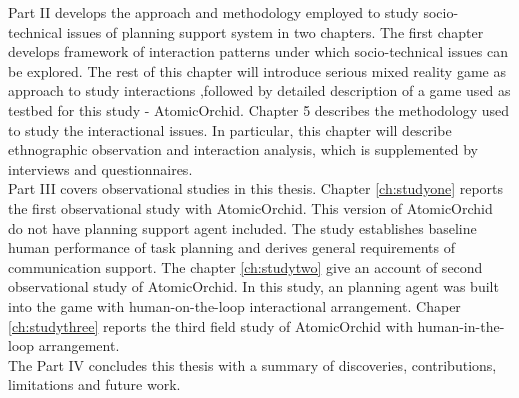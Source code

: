 Part II develops the approach and methodology employed to study socio-technical issues of planning support system in two chapters. The first chapter develops framework of interaction patterns under which socio-technical issues can be explored. The rest of this chapter will introduce serious mixed reality game as approach to study interactions  ,followed by detailed description of a game used as testbed for this study - AtomicOrchid. Chapter 5 describes the methodology used to study the interactional issues. In particular, this chapter will describe ethnographic observation and interaction analysis, which is supplemented by interviews and questionnaires. \\ 

Part III covers observational studies in this thesis. Chapter \ref{ch:studyone} reports the first observational study with AtomicOrchid. This version of AtomicOrchid do not have planning support agent included. The study establishes baseline human performance of task planning and derives general requirements of communication support. The chapter \ref{ch:studytwo} give an account of second observational study of AtomicOrchid. In this study, an planning agent was built into the game with human-on-the-loop interactional arrangement. Chaper \ref{ch:studythree} reports the third field study of AtomicOrchid with human-in-the-loop arrangement. \\ 

The Part IV concludes this thesis with a summary of discoveries, contributions, limitations and future work.\\









